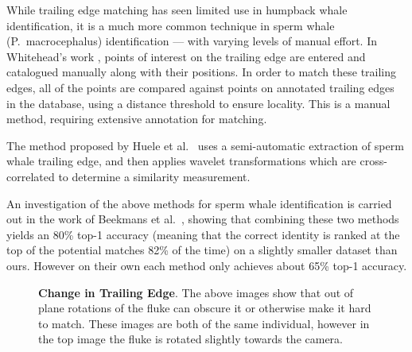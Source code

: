 While trailing edge matching has seen limited use in humpback whale identification, it is a much more common technique in sperm whale (P.\ macrocephalus) identification \cite{huele2000finding, beekmans2005comparison, whitehead1990computer} --- with varying levels of manual effort.
In Whitehead's work \cite{whitehead1990computer}, points of interest on the trailing edge are entered and catalogued manually along with their positions.
In order to match these trailing edges, all of the points are compared against points on annotated trailing edges in the database, using a distance threshold to ensure locality.
This is a manual method, requiring extensive annotation for matching.

The method proposed by Huele et al.\ \cite{huele2000finding} uses a semi-automatic extraction of sperm whale trailing edge, and then applies wavelet transformations which are cross-correlated to determine a similarity measurement.

An investigation of the above methods for sperm whale identification is carried out in the work of Beekmans et al.\ \cite{beekmans2005comparison}, showing that combining these two methods yields an 80\% top-1 accuracy (meaning that the correct identity is ranked at the top of the potential matches 82\% of the time) on a slightly smaller dataset than ours.
However on their own each method only achieves about 65\% top-1 accuracy.

\begin{figure}[t]%
\centering
{}
\newline
{}
\caption{\textbf{Change in Trailing Edge}. The above images show that out of plane rotations of the fluke can obscure it or otherwise make it hard to match. These images are both of the same individual, however in the top image the fluke is rotated slightly towards the camera.}
\label{fig:unclear_te}
\end{figure}

